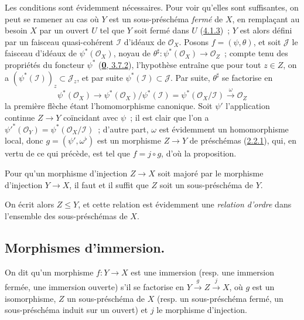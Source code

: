 Les conditions sont évidemment nécessaires. Pour voir qu'elles sont
suffisantes, on peut se ramener au cas où $Y$ est un sous-préschéma
\emph{fermé} de $X$, en remplaçant au besoin $X$ par un ouvert $U$ tel que
$Y$ soit fermé dans $U$ (\hyperref[I.4.1.3-fr]{4.1.3})~; $Y$ est alors défini
par un faisceau quasi-cohérent $\mathscr{I}$ d'idéaux de $\mathscr{O}_X$.
Posons $f=(\psi,\theta)$, et soit $\mathscr{J}$ le faisceau d'idéaux de
$\psi^*(\mathscr{O}_X)$, noyau de
$\theta^\sharp:\psi^*(\mathscr{O}_X)\to\mathscr{O}_Z$~; compte tenu des
propriétés du foncteur $\psi^*$ (\hyperref[0.3.7.2-fr]{\textbf{0}, 3.7.2}),
l'hypothèse entraîne que pour tout $z\in Z$, on a
$(\psi^*(\mathscr{I}))_z\subset\mathscr{J}_z$, et par suite
$\psi^*(\mathscr{I})\subset\mathscr{J}$. Par suite, $\theta^\sharp$ se
factorise en
\[
  \psi^*(\mathscr{O}_X)\longrightarrow
  \psi^*(\mathscr{O}_X)/\psi^*(\mathscr{I})
  =\psi^*(\mathscr{O}_X/\mathscr{I})
  \xrightarrow{\omega}\mathscr{O}_Z
\]
la première flèche étant l'homomorphisme canonique. Soit $\psi'$ l'application
continue $Z\to Y$ coïncidant avec $\psi$~; il est clair que l'on a
${\psi'}^*(\mathscr{O}_Y)=\psi^*(\mathscr{O}_X/\mathscr{I})$~; d'autre part,
$\omega$ est évidemment un homomorphisme local, donc
$g=(\psi',\omega^\flat)$ est un morphisme $Z\to Y$
de préschémas (\hyperref[I.2.2.1-fr]{2.2.1}), qui, en vertu de ce qui précède,
est tel que $f=j\circ g$, d'où la proposition.

\begin{corollary}[4.1.10]
\label{I.4.1.10-fr}
Pour qu'un morphisme d'injection $Z\to X$ soit majoré par le morphisme
d'injection $Y\to X$, il faut et il suffit que $Z$ soit un sous-préschéma de
$Y$.
\end{corollary}

On écrit alors $Z\leq Y$, et cette relation est évidemment une
\emph{relation d'ordre} dans l'ensemble des sous-préschémas de $X$.

\subsection{Morphismes d'immersion.}
\label{subsection:I.4.2-fr}

\begin{definition}[4.2.1]
\label{I.4.2.1-fr}
On dit qu'un morphisme $f:Y\to X$ est une immersion (\textup{resp.} une
immersion fermée, une immersion ouverte) s'il se factorise en
$Y\xrightarrow{g}Z\xrightarrow{j}X$, où $g$ est un isomorphisme, $Z$ un
sous-préschéma de $X$ (\textup{resp.} un sous-préschéma fermé, un sous-préschéma induit
sur un ouvert) et $j$ le morphisme d'injection.
\end{definition}

